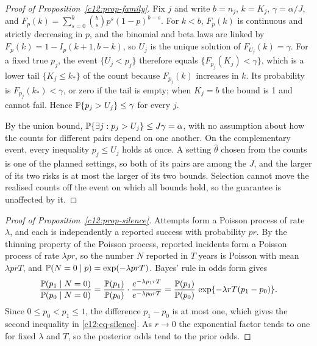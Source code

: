 \begin{proof}[Proof of Proposition~\ref{c12:prop-family}]
Fix $j$ and write $b = n_j$, $k = K_j$, $\gamma = \alpha/J$, and
$F_p(k) = \sum_{s=0}^{k}\binom{b}{s}p^s(1-p)^{b-s}$. For $k < b$, $F_p(k)$ is continuous
and strictly decreasing in $p$, and the binomial and beta laws are linked by
$F_p(k) = 1 - I_p(k+1, b-k)$, so $U_j$ is the unique solution of $F_{U_j}(k) = \gamma$.
For a fixed true $p_j$, the event $\{U_j < p_j\}$ therefore equals
$\{F_{p_j}(K_j) < \gamma\}$, which is a lower tail $\{K_j \le k_\ast\}$ of the count
because $F_{p_j}(k)$ increases in $k$. Its probability is $F_{p_j}(k_\ast) < \gamma$,
or zero if the tail is empty; when $K_j = b$ the bound is 1 and cannot fail. Hence
$\mathbb{P}\{p_j > U_j\} \le \gamma$ for every $j$.

By the union bound,
$\mathbb{P}\{\exists j : p_j > U_j\} \le J\gamma = \alpha$, with no assumption about how the
counts for different pairs depend on one another. On the complementary event, every
inequality $p_j \le U_j$ holds at once. A setting $\hat\theta$ chosen from the counts is
one of the planned settings, so both of its pairs are among the $J$, and the larger of its
two risks is at most the larger of its two bounds. Selection cannot move the realised
counts off the event on which all bounds hold, so the guarantee is unaffected by it.
\end{proof}

\begin{proof}[Proof of Proposition~\ref{c12:prop-silence}]
Attempts form a Poisson process of rate $\lambda$, and each is independently a reported
success with probability $pr$. By the thinning property of the Poisson process, reported
incidents form a Poisson process of rate $\lambda p r$, so the number $N$ reported in $T$
years is Poisson with mean $\lambda p r T$, and
$\mathbb{P}(N = 0 \mid p) = \exp(-\lambda p r T)$. Bayes' rule in odds form gives
\[
\frac{\mathbb{P}(p_1 \mid N = 0)}{\mathbb{P}(p_0 \mid N = 0)}
= \frac{\mathbb{P}(p_1)}{\mathbb{P}(p_0)}\cdot\frac{e^{-\lambda p_1 r T}}{e^{-\lambda p_0 r T}}
= \frac{\mathbb{P}(p_1)}{\mathbb{P}(p_0)}\,\exp\{-\lambda r T(p_1 - p_0)\}.
\]
Since $0 \le p_0 < p_1 \le 1$, the difference $p_1 - p_0$ is at most one, which gives the
second inequality in \eqref{c12:eq-silence}. As $r \to 0$ the exponential factor tends to
one for fixed $\lambda$ and $T$, so the posterior odds tend to the prior odds.
\end{proof}
